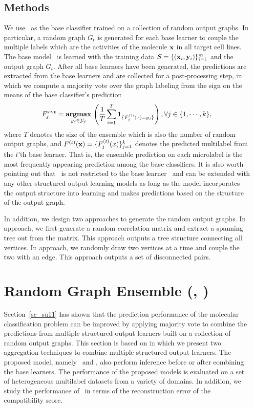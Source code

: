 {\subsection{Methods}

We use \mmcrf\ as the base classifier trained on a collection of random output graphs.
In particular, a random graph $G_t$ is generated for each base learner to couple the multiple labels which are the activities of the molecule $\mathbf {x}$ in all target cell lines.
The base model \mmcrf\ is learned with the training data $S=\{(\mathbf {x}_i,\mathbf {y}_i)\}_{i=1}^{m}$ and the output graph $G_t$.
After all base learners have been generated, the predictions are extracted from the base learners and are collected for a post-processing step, in which we compute a majority vote over the graph labeling from the sign on the means of the base classifier's prediction
\begin{align*}
	F_j^{\text{{\sc mve}}}=\underset{y_j\in\mathcal{Y}_j}{\textbf{argmax}}\,\left(\frac{1}{T}\sum_{i=1}^{T}\mathbf{1}_{\{F_j^{(t)}(x)=y_j\}}\right), \forall j\in\{1,\cdots,k\},
\end{align*}
where $T$ denotes the size of the ensemble which is also the number of random output graphs, and $F^{(t)}(\mathbf {x})=\{F^{(t)}_j(x)\}_{j=1}^{k}$ denotes the predicted multilabel from the $t$'th base learner.
That is, the ensemble prediction on each microlabel is the most frequently appearing prediction among the base classifiers.
It is also worth pointing out that \mve\ is not restricted to the base learner \mmcrf\ and can be extended with any other structured output learning models as long as the model incorporates the output structure into learning and makes predictions based on the structure of the output graph.

In addition, we design two approaches to generate the random output graphs.
In  approach, we first generate a random correlation matrix and extract a spanning tree out from the matrix.
This approach outputs a tree structure connecting all vertices.
In  approach, we randomly draw two vertices at a time and couple the two with an edge.
This approach outputs a set of disconnected pairs.



%
%
\section{Random Graph Ensemble (\amm, \mam)} \label{sc_su14b}

Section~\ref{sc_su11} has shown that the prediction performance of the molecular classification problem can be improved by applying majority vote to combine the predictions from multiple structured output learners built on a collection of random output graphs.
This section is based on  in which we present two aggregation techniques to combine multiple structured output learners. 
The proposed model, namely \amm\ and \mam, also perform inference before or after combining the base learners.
The performance of the proposed models is evaluated on a set of heterogeneous multilabel datasets from a variety of domains.
In addition, we study the performance of \mam\ in terms of the reconstruction error of the compatibility score.



}
